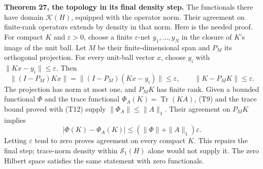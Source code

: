 \documentclass[
  11pt,
]{article}
\begin{document}
\textbf{Theorem 27, the topology in its final density step.} The
functionals there have domain \(\mathcal K(H)\), equipped with the
operator norm. Their agreement on finite-rank operators extends by
density in that norm. Here is the needed proof. For compact \(K\) and
\(\varepsilon>0\), choose a finite \(\varepsilon\)-net
\(y_1,\ldots,y_N\) in the closure of \(K\)'s image of the unit ball. Let
\(M\) be their finite-dimensional span and \(P_M\) its orthogonal
projection. For every unit-ball vector \(x\), choose \(y_i\) with
\(\|Kx-y_i\|\leq\varepsilon\). Then \[
 \|(I-P_M)Kx\|=\|(I-P_M)(Kx-y_i)\|\leq\varepsilon,
 \qquad\|K-P_MK\|\leq\varepsilon.
 \tag{BE6}
\] The projection has norm at most one, and \(P_MK\) has finite rank.
Given a bounded functional \(\Phi\) and the trace functional
\(\Phi_A(K)=\operatorname{Tr}(KA)\), (T9) and the trace bound proved
with (T12) supply \(\|\Phi_A\|\leq\|A\|_1\). Their agreement on \(P_MK\)
implies \[
 |\Phi(K)-\Phi_A(K)|
 \leq(\|\Phi\|+\|A\|_1)\varepsilon.
 \tag{BE7}
\] Letting \(\varepsilon\) tend to zero proves agreement on every
compact \(K\). This repairs the final step; trace-norm density within
\(\mathcal S_1(H)\) alone would not supply it. The zero Hilbert space
satisfies the same statement with zero functionals.
\end{document}
